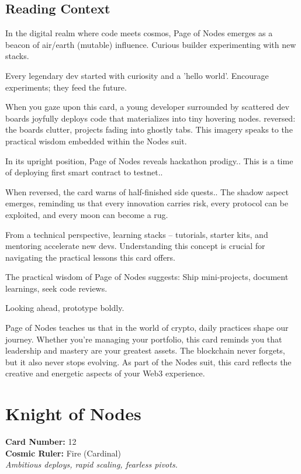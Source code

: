 \documentclass[11pt,oneside]{book}
\begin{document}
\begin{minipage}[t]{0.55\textwidth}
  \subsection*{Reading Context}
  In the digital realm where code meets cosmos, Page of Nodes emerges as a beacon of air/earth (mutable) influence. Curious builder experimenting with new stacks.

  Every legendary dev started with curiosity and a 'hello world'. Encourage experiments; they feed the future.

  When you gaze upon this card, a young developer surrounded by scattered dev boards joyfully deploys code that materializes into tiny hovering nodes. reversed: the boards clutter, projects fading into ghostly tabs. This imagery speaks to the practical wisdom embedded within the Nodes suit.

  In its upright position, Page of Nodes reveals hackathon prodigy.. This is a time of deploying first smart contract to testnet..

  When reversed, the card warns of half-finished side quests.. The shadow aspect emerges, reminding us that every innovation carries risk, every protocol can be exploited, and every moon can become a rug.

  From a technical perspective, learning stacks – tutorials, starter kits, and mentoring accelerate new devs. Understanding this concept is crucial for navigating the practical lessons this card offers.

  The practical wisdom of Page of Nodes suggests: Ship mini-projects, document learnings, seek code reviews.

  Looking ahead, prototype boldly.

  Page of Nodes teaches us that in the world of crypto, daily practices shape our journey. Whether you're managing your portfolio, this card reminds you that leadership and mastery are your greatest assets. The blockchain never forgets, but it also never stops evolving. As part of the Nodes suit, this card reflects the creative and energetic aspects of your Web3 experience.

\end{minipage}

\newpage
\section*{Knight of Nodes}

\begin{minipage}[t]{0.55\textwidth}
  \vspace{0pt}
  \textbf{Card Number:} 12\\  \textbf{Cosmic Ruler:} Fire (Cardinal)\\  \textit{Ambitious deploys, rapid scaling, fearless pivots.}
\end{minipage}
\end{document}
